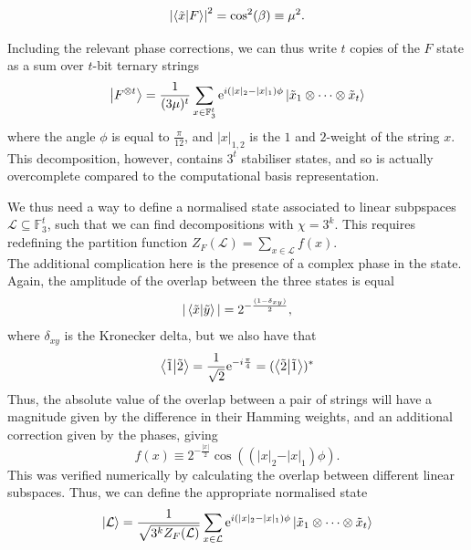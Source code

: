 \documentclass{standalone}
\begin{document}
\begin{equation}
\left|\braket{\tilde{x}}{F}\right|^{2} = \cos^{2}(\beta)\equiv\mu^{2}.
\end{equation}
\par
Including the relevant phase corrections, we can thus write $t$ copies of the $F$ state as a sum over $t$-bit ternary strings
\begin{equation}
    \ket{F^{\otimes t}} = \frac{1}{(3\mu)^{t}}\sum_{x\in\mathbb{F}_{3}^{t}}\mathrm{e}^{i(\vert x\vert_{2}-\vert x\vert_{1})\phi}\ket{\tilde{x}_{1}\otimes\cdots\otimes\tilde{x}_{t}}
\end{equation}
where the angle $\phi$ is equal to $\frac{\pi}{12}$, and $\vert x\vert_{1,2}$ is the $1$ and $2$-weight of the string $x$.\\
This decomposition, however, contains $3^{t}$ stabiliser states, and so is actually overcomplete compared to the computational basis representation. 
\par
We thus need a way to define a normalised state associated to linear subpspaces $\mathcal{L}\subseteq\mathbb{F}_{3}^{t}$, such that we can find decompositions with $\chi=3^{k}$. This requires redefining the partition function $Z_{F}(\mathcal{L})=\sum_{x\in\mathcal{L}}f(x)$.\\
The additional complication here is the presence of a complex phase in the state. Again, the amplitude of the overlap between the three states is equal
\[\vert\braket{\tilde{x}}{\tilde{y}}\vert = 2^{-\frac{(1-\delta_{xy})}{2}},\]
where $\delta_{xy}$ is the Kronecker delta, but we also have that 
\[
\braket{\tilde{1}}{\tilde{2}}=\frac{1}{\sqrt{2}} 
\mathrm{e}^{-i\frac{\pi}{4}} 
= (\braket{\tilde{2}}{\tilde{1}})^*
\]
Thus, the absolute value of the overlap between a pair of strings will have a magnitude given by the difference in their Hamming weights, and an additional correction given by the phases, giving
\begin{equation}
    f(x)\equiv 2^{-\frac{\vert x\vert}{2}}\cos((\vert x\vert_{2}-\vert x\vert_{1})\phi).
\end{equation}
This was verified numerically by calculating the overlap between different linear subspaces. Thus, we can define the appropriate normalised state
\begin{equation}
    \ket{\mathcal{L}}=\frac{1}{\sqrt{3^{k}Z_{F}(\mathcal{L})}}\sum_{x\in\mathcal{L}}
    \mathrm{e}^{i(\vert x\vert_{2}-\vert x\vert_{1})\phi}\ket{\tilde{x}_{1}\otimes\cdots\otimes\tilde{x}_{t}}
\end{equation}
\par
\end{document}
